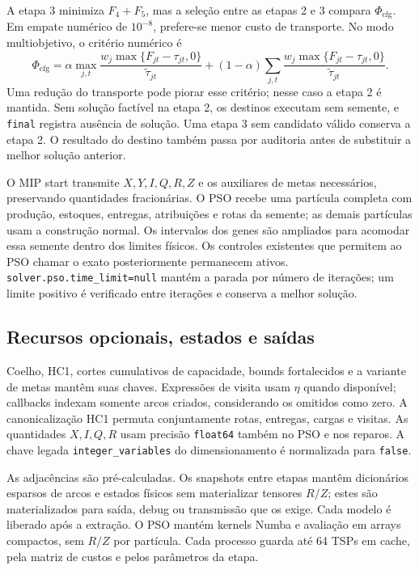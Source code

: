\documentclass[11pt,a4paper]{article}
\begin{document}
A etapa 3 minimiza $F_4+F_5$, mas a seleção entre as etapas 2 e 3 compara $\Phi_{\mathrm{cfg}}$. Em empate numérico de $10^{-8}$, prefere-se menor custo de transporte. No modo multiobjetivo, o critério numérico é
\[
 \Phi_{\mathrm{cfg}}=\alpha\max_{j,t}
 \frac{w_j\max\{F_{jt}-\tau_{jt},0\}}{\widetilde\tau_{jt}}
 +(1-\alpha)\sum_{j,t}
 \frac{w_j\max\{F_{jt}-\tau_{jt},0\}}{\widetilde\tau_{jt}}.
\]
Uma redução do transporte pode piorar esse critério; nesse caso a etapa 2 é mantida. Sem solução factível na etapa 2, os destinos executam sem semente, e \texttt{final} registra ausência de solução. Uma etapa 3 sem candidato válido conserva a etapa 2. O resultado do destino também passa por auditoria antes de substituir a melhor solução anterior.

O MIP start transmite $X,Y,I,Q,R,Z$ e os auxiliares de metas necessários, preservando quantidades fracionárias. O PSO recebe uma partícula completa com produção, estoques, entregas, atribuições e rotas da semente; as demais partículas usam a construção normal. Os intervalos dos genes são ampliados para acomodar essa semente dentro dos limites físicos. Os controles existentes que permitem ao PSO chamar o exato posteriormente permanecem ativos. \texttt{solver.pso.time\_limit=null} mantém a parada por número de iterações; um limite positivo é verificado entre iterações e conserva a melhor solução.

\subsection{Recursos opcionais, estados e saídas}

Coelho, HC1, cortes cumulativos de capacidade, bounds fortalecidos e a variante de metas mantêm suas chaves. Expressões de visita usam $\eta$ quando disponível; callbacks indexam somente arcos criados, considerando os omitidos como zero. A canonicalização HC1 permuta conjuntamente rotas, entregas, cargas e visitas. As quantidades $X,I,Q,R$ usam precisão \texttt{float64} também no PSO e nos reparos. A chave legada \texttt{integer\_variables} do dimensionamento é normalizada para \texttt{false}.

As adjacências são pré-calculadas. Os snapshots entre etapas mantêm dicionários esparsos de arcos e estados físicos sem materializar tensores $R/Z$; estes são materializados para saída, debug ou transmissão que os exige. Cada modelo é liberado após a extração. O PSO mantém kernels Numba e avaliação em arrays compactos, sem $R/Z$ por partícula. Cada processo guarda até 64 TSPs em cache, pela matriz de custos e pelos parâmetros da etapa.
\end{document}
